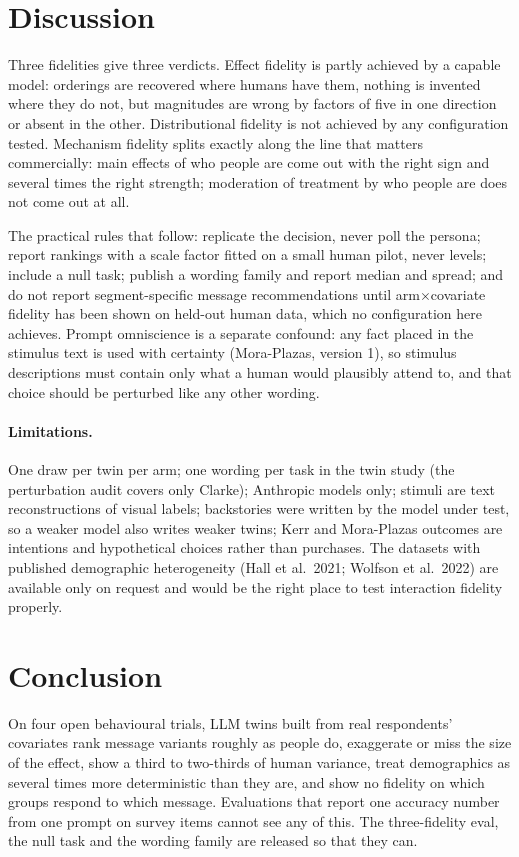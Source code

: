 \documentclass[10pt,twocolumn]{article}
\begin{document}
\section{Discussion}
Three fidelities give three verdicts. Effect fidelity is partly achieved by a capable model: orderings are recovered where humans have them, nothing is invented where they do not, but magnitudes are wrong by factors of five in one direction or absent in the other. Distributional fidelity is not achieved by any configuration tested. Mechanism fidelity splits exactly along the line that matters commercially: main effects of who people are come out with the right sign and several times the right strength; moderation of treatment by who people are does not come out at all.

The practical rules that follow: replicate the decision, never poll the persona; report rankings with a scale factor fitted on a small human pilot, never levels; include a null task; publish a wording family and report median and spread; and do not report segment-specific message recommendations until arm$\times$covariate fidelity has been shown on held-out human data, which no configuration here achieves. Prompt omniscience is a separate confound: any fact placed in the stimulus text is used with certainty (Mora-Plazas, version 1), so stimulus descriptions must contain only what a human would plausibly attend to, and that choice should be perturbed like any other wording.

\paragraph{Limitations.} One draw per twin per arm; one wording per task in the twin study (the perturbation audit covers only Clarke); Anthropic models only; stimuli are text reconstructions of visual labels; backstories were written by the model under test, so a weaker model also writes weaker twins; Kerr and Mora-Plazas outcomes are intentions and hypothetical choices rather than purchases. The datasets with published demographic heterogeneity (Hall et al.\ 2021; Wolfson et al.\ 2022) are available only on request and would be the right place to test interaction fidelity properly.

\section{Conclusion}
On four open behavioural trials, LLM twins built from real respondents' covariates rank message variants roughly as people do, exaggerate or miss the size of the effect, show a third to two-thirds of human variance, treat demographics as several times more deterministic than they are, and show no fidelity on which groups respond to which message. Evaluations that report one accuracy number from one prompt on survey items cannot see any of this. The three-fidelity eval, the null task and the wording family are released so that they can.
\end{document}
